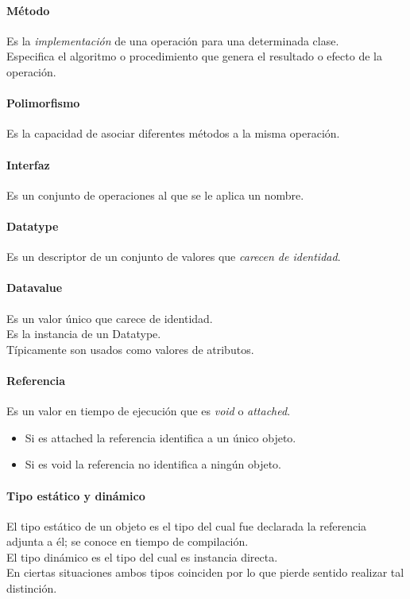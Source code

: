 \documentclass[a4paper,12pt,oneside]{report}
\begin{document}
        \paragraph{M\'etodo}
          Es la \emph{implementaci\'on} de una operaci\'on para una
          determinada clase.\\
          Especifica el algoritmo o procedimiento que genera el resultado o
          efecto de la operaci\'on.

        \paragraph{Polimorfismo}
          Es la capacidad de asociar diferentes m\'etodos a la misma operaci\'on.

        \paragraph{Interfaz}
          Es un conjunto de operaciones al que se le aplica un nombre.

        \paragraph{Datatype}
          Es un descriptor de un conjunto de valores que \emph{carecen de identidad}.

        \paragraph{Datavalue}
          Es un valor \'unico que carece de identidad.\\
          Es la instancia de un Datatype.\\
          T\'ipicamente son usados como valores de atributos.

        \paragraph{Referencia}
          Es un valor en tiempo de ejecuci\'on que es \emph{void} o \emph{attached}.
          \begin{itemize}
            \item Si es attached la referencia identifica a un \'unico objeto.
            \item Si es void la referencia no identifica a ning\'un objeto.
          \end{itemize}

        \paragraph{Tipo est\'atico y din\'amico}
          El tipo est\'atico de un objeto es el tipo del cual fue declarada la referencia
          adjunta a \'el; se conoce en tiempo de compilaci\'on.\\
          El tipo din\'amico es el tipo del cual es instancia directa.\\
          En ciertas situaciones ambos tipos coinciden por lo que pierde sentido realizar tal
          distinci\'on.
\end{document}
